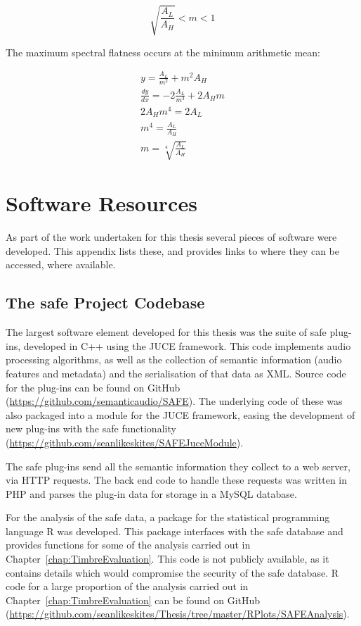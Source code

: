 \begin{appendices}
		\[ \sqrt{\frac{A_{L}}{A_{H}}} < m < 1 \]

		The maximum spectral flatness occurs at the minimum arithmetic mean:

		\begin{gather}
			y = \frac{A_{L}}{m^{2}} + m^{2}A_{H} \nonumber \\[0.6em]
			\frac{dy}{dx} = -2\frac{A_{L}}{m^{3}} + 2A_{H}m \nonumber \\[0.6em]
			2A_{H}m^{4} = 2A_{L} \nonumber \\[0.6em]
			m^{4} = \frac{A_{L}}{A_{H}} \nonumber \\[0.6em]
			m = \sqrt[4]{\frac{A_{L}}{A_{H}}} \nonumber
		\end{gather}

\chapter{Software Resources}
	As part of the work undertaken for this thesis several pieces of software were developed. This appendix lists these,
	and provides links to where they can be accessed, where available.
	
	\section{The \acrshort{safe} Project Codebase}
		The largest software element developed for this thesis was the suite of \acrshort{safe} plug-ins, developed
		in C++ using the JUCE framework. This code implements audio processing algorithms, as well as the collection
		of semantic information (audio features and metadata) and the serialisation of that data as XML. Source code
		for the plug-ins can be found on GitHub
		(\href{https://github.com/semanticaudio/SAFE}{https://github.com/semanticaudio/SAFE}). The underlying code
		of these was also packaged into a module for the JUCE framework, easing the development of new plug-ins with
		the \acrshort{safe} functionality
		(\href{https://github.com/seanlikeskites/SAFEJuceModule}{https://github.com/seanlikeskites/SAFEJuceModule}).

		The \acrshort{safe} plug-ins send all the semantic information they collect to a web server, via HTTP
		requests. The back end code to handle these requests was written in PHP and parses the plug-in data for
		storage in a MySQL database.

		For the analysis of the \acrshort{safe} data, a package for the statistical programming language R was
		developed. This package interfaces with the \acrshort{safe} database and provides functions for some of the
		analysis carried out in Chapter~\ref{chap:TimbreEvaluation}. This code is not publicly available, as it
		contains details which would compromise the security of the \acrshort{safe} database. R code for a large
		proportion of the analysis carried out in Chapter~\ref{chap:TimbreEvaluation} can be found on GitHub
		(\href{https://github.com/seanlikeskites/Thesis/tree/master/RPlots/SAFEAnalysis}
		{https://github.com/seanlikeskites/Thesis/tree/master/RPlots/SAFEAnalysis}).


\end{appendices}
